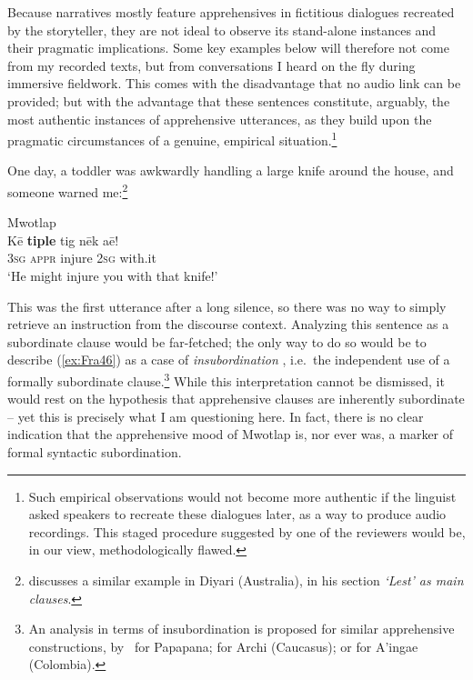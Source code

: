 \documentclass[output=paper,colorlinks,citecolor=brown]{langscibook}
\begin{document}
Because narratives mostly feature apprehensives in fictitious dialogues recreated by the storyteller, they are not ideal to observe its stand-alone instances and their pragmatic implications. Some key examples below will therefore not come from my recorded texts, but from conversations I heard on the fly during immersive fieldwork. This comes with the disadvantage that no audio link can be provided; but with the advantage that these sentences constitute, arguably, the most authentic instances of apprehensive utterances, as they build upon the pragmatic circumstances of a genuine, empirical situation.\footnote{Such empirical observations would not become more authentic if the linguist asked speakers to recreate these dialogues later, as a way to produce audio recordings. This staged procedure suggested by one of the reviewers would be, in our view, methodologically flawed.}

One day, a toddler was awkwardly handling a large knife around the house, and someone warned me:\footnote{\citet[229]{Austin1981} discusses a similar example in Diyari (Australia), in his section \textit{`Lest' as main clauses}.}


\ea \label{ex:Fra46} \textnormal{Mwotlap} \francoissource{{[Mtp.AF-BP4-07b]}} \\
\gll Kē \textbf{tiple} tig nēk aē! \\
\textsc{3sg} \textsc{appr} injure \textsc{2sg} with.it \\
\glt `He might injure you with that knife!' \\
\z


\noindent This was the first utterance after a long silence, so there was no way to simply retrieve an instruction from the discourse context. Analyzing this sentence as a subordinate clause would be far-fetched; the only way to do so would be to describe (\ref{ex:Fra46}) as a case of \textit{insubordination} \citep{evans_insubordination_2007}, i.e.\ the independent use of a formally subordinate clause.\footnote{An analysis in terms of insubordination is proposed for similar apprehensive constructions, by~\citet{smithdennis2021} for Papapana; \citet{chapters/daniel} for Archi (Caucasus); or \citet{chapters/dabkowski-anderbois} for A'ingae (Colombia).} While this interpretation cannot be dismissed, it would rest on the hypothesis that apprehensive clauses are inherently subordinate -- yet this is precisely what I am questioning here. In fact, there is no clear indication that the apprehensive mood of Mwotlap is, nor ever was, a marker of formal syntactic subordination.
\end{document}
